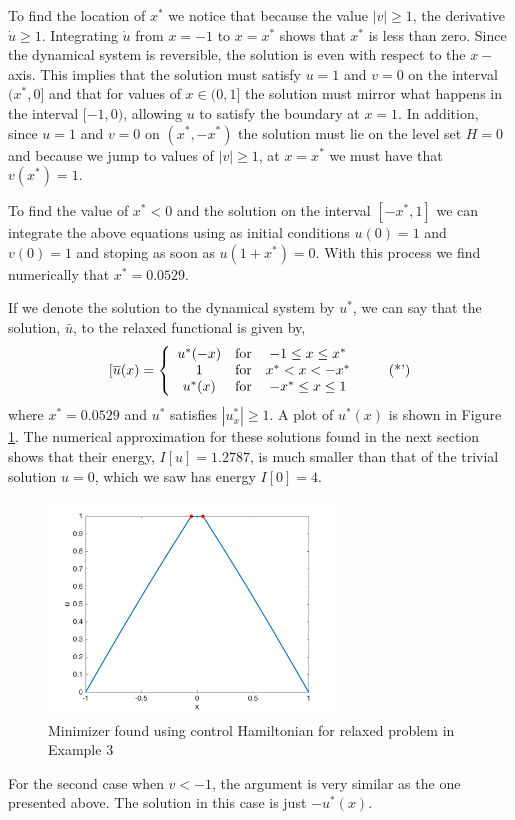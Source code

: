 \documentclass[11pt]{article}
\theoremstyle{plain}
\begin{document}
To find the location of $x^*$ we notice that because the value $|v|\geq 1$, the derivative $\dot{u} \geq 1$. Integrating $\dot{u}$ from $x=-1$ to $x=x^*$ shows that $x^*$ is less than zero. Since the dynamical system is reversible, the solution is even with respect to the $x-$axis. This implies that the solution must satisfy $u=1$ and $v=0$ on the interval $(x^*,0]$ and that for values of $x \in (0,1]$ the solution must mirror what happens in the interval $[-1,0)$, allowing $u$ to satisfy the boundary at $x=1$. In addition, since $u=1$ and $v=0$ on $(x^*,-x^*)$ the solution must lie on the level set $H=0$ and because we jump to values of $|v|\geq 1$, at $x=x^*$ we must have that $v(x^*) = 1$.

 To find the value of $x^*<0$ and the solution on the interval $[-x^*,1]$ we can integrate the above equations using as initial conditions $u(0)=1$ and $v(0)=1$ and stoping as soon as $u(1+x^*)=0$. With this process we find numerically that $x^* = 0.0529$. 
 
 If we denote  the solution to the dynamical system by $u^*$, we can say that the solution, $\bar{u}$, to the relaxed functional is given by,
\begin{equation}\label{e:sol}
[ \overline{u}(x)  = \left \{ \begin{array}{c c c}
u^*(-x) & \mbox{for} & -1\leq x \leq x^*\\
1 & \mbox{for} & x^*< x< -x^*\\
u^*(x) & \mbox{for} & -x^*\leq x \leq1
\end{array} \right. \tag{*'}
\end{equation}
where $x^*=0.0529$ and $u^*$ satisfies $|u^*_x|\geq 1 $. A plot of $u^*(x)$ is shown in Figure \ref{fig:sol3}. The numerical approximation for these solutions found in the next section shows that their energy, $I[u] = 1.2787$, is much smaller than that of the trivial solution $u=0$, which we saw has energy $I[0] = 4$. 

\begin{figure}[htbp] %
   \centering
   \includegraphics[width=3in]{sol3.jpg} 
   \caption{Minimizer found using control Hamiltonian for relaxed problem in Example 3}
   \label{fig:sol3}
\end{figure}
For the second case when $v<-1$, the argument is very similar as the one presented above. The solution in this case is just $-u^*(x)$.
\end{document}
